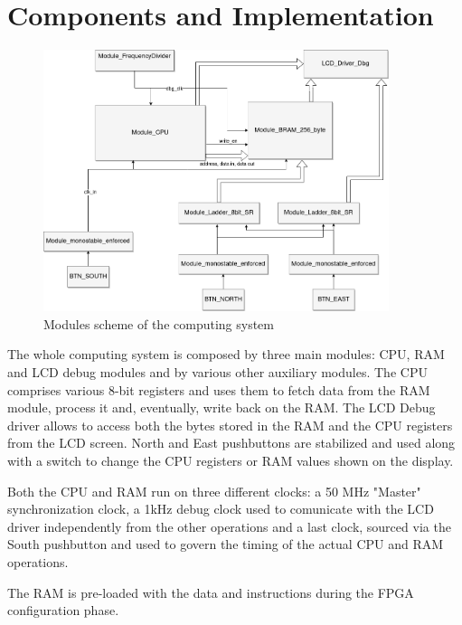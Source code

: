 \section{Components and Implementation} \label{sec:impl}

\begin{figure}[hbtp]
    \centering
    \includegraphics[width=0.9\textwidth]{img/System.png}
    \caption{Modules scheme of the computing system}
    \label{fig:system}
\end{figure}

The whole computing system is composed by three main modules: CPU, RAM and LCD debug modules
and by various other auxiliary modules.
The CPU comprises various 8-bit registers and uses them to fetch data from the RAM module, process it and, eventually, write back on the RAM.
The LCD Debug driver allows to access both the bytes stored in the RAM and the CPU registers from the LCD screen.
North and East pushbuttons are stabilized and used along with a switch to change the CPU registers or RAM values shown on the display.

Both the CPU and RAM run on three different clocks: a 50 MHz "Master" synchronization clock,
 a 1kHz debug clock used to comunicate with the LCD driver independently from the other operations
 and a last clock, sourced via the South pushbutton and used to govern the timing of the actual CPU and RAM operations.

 The RAM is pre-loaded with the data and instructions during the FPGA configuration phase.




